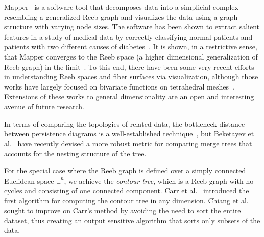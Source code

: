 Mapper~\cite{SinghMemoliCarlsson2007} is a software tool that decomposes data into a simplicial complex resembling a generalized Reeb graph and visualizes the data using a graph structure with varying node sizes.
%
The software has been shown to extract salient features in a study of medical data by correctly classifying normal patients and patients with two different causes of diabetes~\cite{SarikondaPettusPhatak2014}.
%
It is shown, in a restrictive sense, that Mapper converges to the Reeb space (a higher dimensional generalization of Reeb graph) in the limit~\cite{MunchWang2016}.
%
To this end, there have been some very recent efforts in understanding Reeb spaces and fiber surfaces via visualization, although those works have largely focused on bivariate functions on tetrahedral meshes~\cite{CarrGengTierny2015,KlacanskyTiernyCarr2016,TiernyCarr2016}.
%
Extensions of these works to general dimensionality are an open and interesting avenue of future research.

In terms of comparing the topologies of related data, the bottleneck distance between persistence diagrams is a well-established technique~\cite{Cohen-SteinerEdelsbrunnerHarer2007}, but Beketayev et al.~\cite{BeketayevYeliussizovMorozov2014} have recently devised a more robust metric for comparing merge trees that accounts for the nesting structure of the tree.


For the special case where the Reeb graph is defined over a simply connected Euclidean space $\mathbb{E}^n$, we achieve the \textit{contour tree}, which is a Reeb graph with no cycles and consisting of one connected component.
%
Carr et al.~\cite{CarrSnoeyinkAxen2003} introduced the first algorithm for computing the contour tree in any dimension.
%
Chiang et al.~\cite{ChiangLenzLu2005} sought to improve on Carr's method by avoiding the need to sort the entire dataset, thus creating an output sensitive algorithm that sorts only subsets of the data.
%

